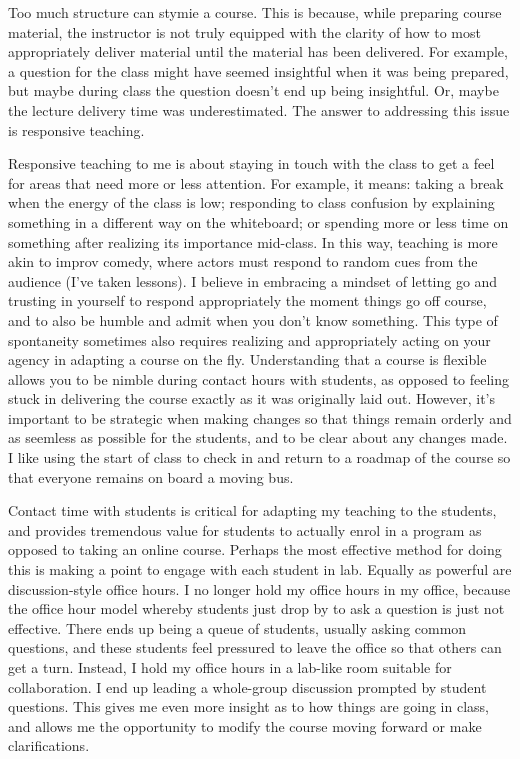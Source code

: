 \documentclass[]{book}
\begin{document}
Too much structure can stymie a course. This is because, while preparing course material, the instructor is not truly equipped with the clarity of how to most appropriately deliver material until the material has been delivered. For example, a question for the class might have seemed insightful when it was being prepared, but maybe during class the question doesn't end up being insightful. Or, maybe the lecture delivery time was underestimated. The answer to addressing this issue is responsive teaching.

Responsive teaching to me is about staying in touch with the class to get a feel for areas that need more or less attention. For example, it means: taking a break when the energy of the class is low; responding to class confusion by explaining something in a different way on the whiteboard; or spending more or less time on something after realizing its importance mid-class. In this way, teaching is more akin to improv comedy, where actors must respond to random cues from the audience (I've taken lessons). I believe in embracing a mindset of letting go and trusting in yourself to respond appropriately the moment things go off course, and to also be humble and admit when you don't know something. This type of spontaneity sometimes also requires realizing and appropriately acting on your agency in adapting a course on the fly. Understanding that a course is flexible allows you to be nimble during contact hours with students, as opposed to feeling stuck in delivering the course exactly as it was originally laid out. However, it's important to be strategic when making changes so that things remain orderly and as seemless as possible for the students, and to be clear about any changes made. I like using the start of class to check in and return to a roadmap of the course so that everyone remains on board a moving bus.

Contact time with students is critical for adapting my teaching to the students, and provides tremendous value for students to actually enrol in a program as opposed to taking an online course. Perhaps the most effective method for doing this is making a point to engage with each student in lab. Equally as powerful are discussion-style office hours. I no longer hold my office hours in my office, because the office hour model whereby students just drop by to ask a question is just not effective. There ends up being a queue of students, usually asking common questions, and these students feel pressured to leave the office so that others can get a turn. Instead, I hold my office hours in a lab-like room suitable for collaboration. I end up leading a whole-group discussion prompted by student questions. This gives me even more insight as to how things are going in class, and allows me the opportunity to modify the course moving forward or make clarifications.
\end{document}
